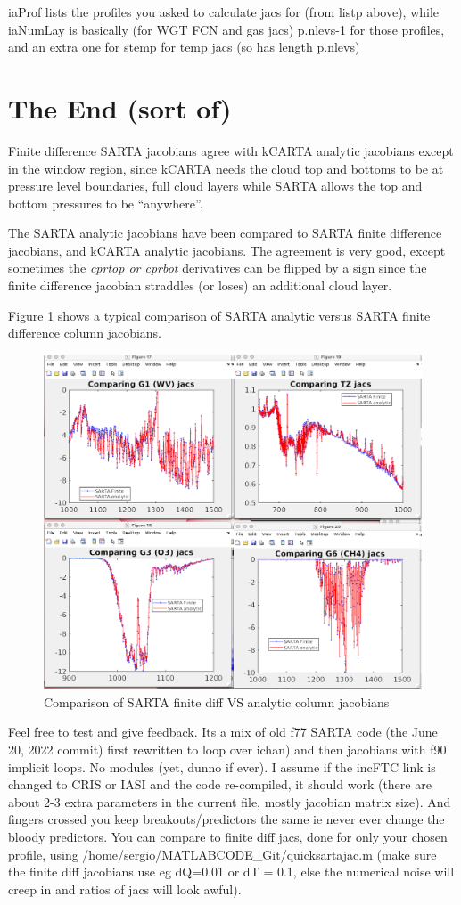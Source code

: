 \documentclass[11pt]{article}
\newcommand{\kc}{\textsf{kCARTA}\xspace}
\newcommand{\sa}{\textsf{SARTA}\xspace}
\begin{document}
iaProf lists the profiles you asked to calculate jacs for (from listp
above), while iaNumLay is basically (for WGT FCN and gas jacs)
p.nlevs-1 for those profiles, and an extra one for stemp for temp jacs
(so has length p.nlevs)

\section{The End (sort of)}

Finite difference \sa jacobians agree with kCARTA analytic jacobians
except in the window region, since \kc needs the cloud top and bottoms
to be at pressure level boundaries, full cloud layers while \sa allows
the top and bottom pressures to be ``anywhere''. 

The \sa analytic jacobians have been compared to \sa finite difference
jacobians, and kCARTA analytic jacobians. The agreement is very good,
except sometimes the \textit{cprtop or cprbot} derivatives can be
flipped by a sign since the finite difference jacobian straddles (or
loses) an additional cloud layer.

Figure \ref{fig:fig3} shows a typical comparison of \sa analytic
versus \sa finite difference column jacobians.

\begin{figure}[ht] \centering
   \includegraphics[width=.75\textwidth]{compare_finite_diff.png}
\caption{Comparison of \sa finite diff VS analytic column jacobians}
\label{fig:fig3}
\end{figure}

Feel free to test and give feedback. Its a mix of old f77 \sa code
(the June 20, 2022 commit) first rewritten to loop over ichan) and
then jacobians with f90 implicit loops. No modules (yet, dunno if
ever). I assume if the incFTC link is changed to CRIS or IASI and the
code re-compiled, it should work (there are about 2-3 extra parameters
in the current file, mostly jacobian matrix size). And fingers crossed
you keep breakouts/predictors the same ie never ever change the bloody
predictors.  You can compare to finite diff jacs, done for only your
chosen profile, using /home/sergio/MATLABCODE\_Git/quicksartajac.m
(make sure the finite diff jacobians use eg dQ=0.01 or dT = 0.1, else
the numerical noise will creep in and ratios of jacs will look awful).
\end{document}
